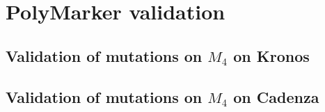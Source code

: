 
\chapter{PolyMarker validation}

\label{app:PolyMarkerValidation}
\begin{sidewaystable}
\section{Validation of mutations on $M_{4}$ on Kronos}
\label{app:PolyMarkerM4ValidationKronos}

\begin{localsize}{6}{7}



\end{localsize}
\end{sidewaystable}

\begin{sidewaystable}

\section{Validation of mutations on $M_{4}$ on Cadenza}

\begin{localsize}{6}{7}

\label{app:PolyMarkerM4ValidationCadenza}

\end{localsize}
\end{sidewaystable}


\begin{sidewaystable}
\begin{localsize}{6}{7}


\end{localsize}
\end{sidewaystable}

\begin{sidewaystable}
\begin{localsize}{6}{7}


\end{localsize}
\end{sidewaystable}
